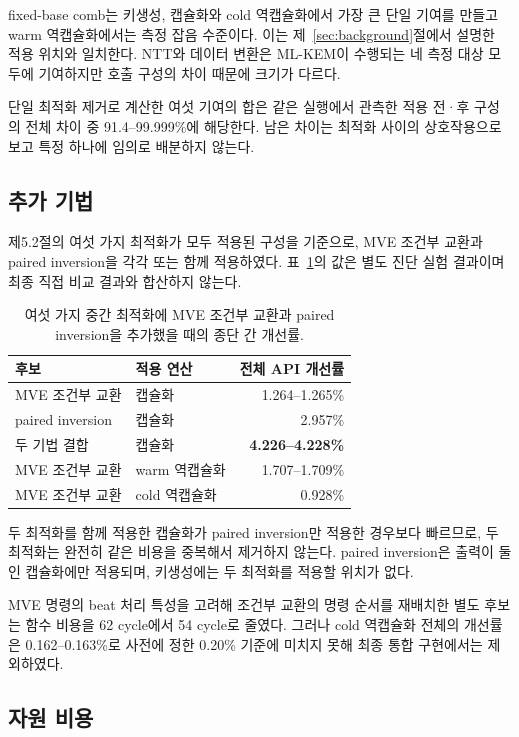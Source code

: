 \documentclass[runningheads,orivec]{llncs}
\begin{document}
fixed-base comb는 키생성, 캡슐화와 cold 역캡슐화에서 가장 큰 단일 기여를 만들고
warm 역캡슐화에서는 측정 잡음 수준이다. 이는 제~\ref{sec:background}절에서 설명한
적용 위치와 일치한다. NTT와 데이터 변환은 ML-KEM이 수행되는 네 측정 대상 모두에
기여하지만 호출 구성의 차이 때문에 크기가 다르다.

단일 최적화 제거로 계산한 여섯 기여의 합은 같은 실행에서 관측한 적용 전·후 구성의
전체 차이 중 91.4--99.999\%에 해당한다. 남은 차이는 최적화 사이의 상호작용으로
보고 특정 하나에 임의로 배분하지 않는다.

\subsection{추가 기법}

제5.2절의 여섯 가지 최적화가 모두 적용된 구성을 기준으로, MVE 조건부 교환과
paired inversion을 각각 또는 함께 적용하였다. 표~\ref{tab:additional-techniques}의
값은 별도 진단 실험 결과이며 최종 직접 비교 결과와 합산하지 않는다.
\begin{table}[t]
\centering
\caption{여섯 가지 중간 최적화에 MVE 조건부 교환과 paired inversion을 추가했을
때의 종단 간 개선률.}
\label{tab:additional-techniques}
\footnotesize
\begin{tabular}{@{}llr@{}}
\toprule
후보 & 적용 연산 & 전체 API 개선률 \\
\midrule
MVE 조건부 교환 & 캡슐화 & 1.264--1.265\% \\
paired inversion & 캡슐화 & 2.957\% \\
두 기법 결합 & 캡슐화 & \textbf{4.226--4.228\%} \\
MVE 조건부 교환 & warm 역캡슐화 & 1.707--1.709\% \\
MVE 조건부 교환 & cold 역캡슐화 & 0.928\% \\
\bottomrule
\end{tabular}
\end{table}

두 최적화를 함께 적용한 캡슐화가 paired inversion만 적용한 경우보다 빠르므로,
두 최적화는 완전히 같은 비용을 중복해서 제거하지 않는다. paired inversion은 출력이
둘인 캡슐화에만 적용되며, 키생성에는 두 최적화를 적용할 위치가 없다.

MVE 명령의 beat 처리 특성을 고려해 조건부 교환의 명령 순서를 재배치한 별도 후보는
함수 비용을 62 cycle에서 54 cycle로 줄였다. 그러나 cold 역캡슐화 전체의 개선률은
0.162--0.163\%로 사전에 정한 0.20\% 기준에 미치지 못해 최종 통합 구현에서는
제외하였다.

\subsection{자원 비용}
\end{document}
